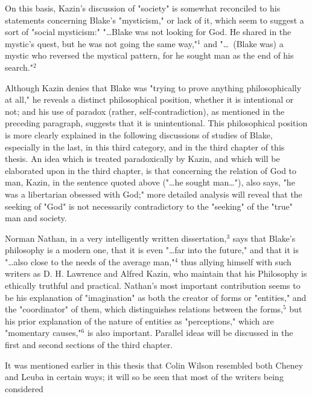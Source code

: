 \noindent On this basis, Kazin's discussion of "society" is somewhat reconciled
to his statements concerning Blake's "mysticism," or lack of it, which seem to suggest a sort of "social
mysticism:" "\dots Blake was not looking for God. He shared in the mystic's quest, but he was not going the same way,"$^{1}$
and "\dots \ (Blake was) a mystic who reversed the mystical pattern, for he sought man as the end of his search."$^{2}$\par
\vspace*{0.5\baselineskip}
Although Kazin denies that Blake was "trying to prove
anything philosophically at all," he reveals a distinct
philosophical position, whether it is intentional or not;
and his use of paradox (rather, self-contradiction), as mentioned
in the preceding paragraph, suggests that it is unintentional. This
philosophical position is more clearly explained in the following discussions
of studies of Blake, especially in the last, in this third category, and in the
third chapter of this thesis. An idea which is treated paradoxically by Kazin, and which
will be elaborated upon in the third chapter, is that concerning the relation of
God to man, Kazin, in the sentence quoted above ("\dots he
sought man\dots"), also says, "he was a libertarian obsessed with God;"
more detailed analysis will reveal that the seeking of "God" is not necessarily contradictory
to the "seeking" of the "true" man and society.\par
\vspace*{0.5\baselineskip}
Norman Nathan, in a very intelligently written dissertation,$^{3}$ says that Blake's
philosophy is a modern one, that it is even "\dots far into the future," and that it is
"\dots also close to the needs of the average man,"$^{4}$ thus allying himself with
such writers as D. H. Lawrence and Alfred Kazin, who maintain that his Philosophy is ethically
truthful and practical. Nathan's most important contribution seems to be his explanation of
"imagination" as both the creator of forms or "entities," and the "coordinator" of them,
which distinguishes relations between the forms,$^{5}$ but his prior explanation of the
nature of entities as "perceptions," which are "momentary causes,"$^{6}$ is also
important. Parallel ideas will be discussed in the first and second sections of the third chapter.\par
\vspace*{0.5\baselineskip}
It was mentioned earlier in this thesis that Colin
Wilson resembled both Cheney and Leuba in certain ways; it
will so be seen that most of the writers being considered
